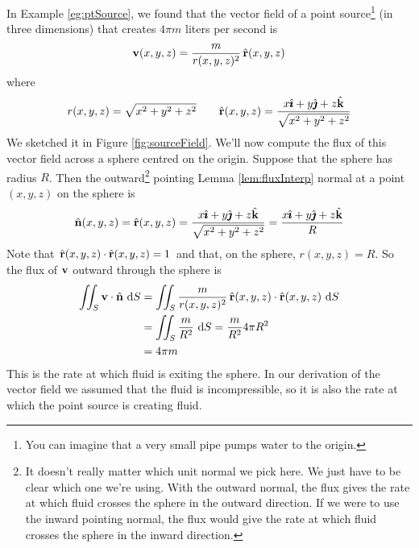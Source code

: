 \begin{eg}\label{eg:fluxIntegralA}
In Example \ref{eg:ptSource}, we found that the vector field of
a point source\footnote{You can imagine that a very small pipe pumps water to
the origin.} (in three dimensions) that creates $4\pi m$ liters per second 
is
\begin{equation*}
\mathbf{v}(x,y,z) = \frac{m}{r(x,y,z)^2}\,\hat{\mathbf{r}}(x,y,z)
\end{equation*}
where
\begin{equation*}
r(x,y,z) = \sqrt{x^2+y^2+z^2}\qquad
\hat{\mathbf{r}}(x,y,z) = \frac{x\hat{\pmb{\imath}} + y\hat{\pmb{\jmath}} + z\hat{\mathbf{k}}}{\sqrt{x^2+y^2+z^2}}
\end{equation*}
We sketched it in Figure \ref{fig:sourceField}.
We'll now compute the flux of this vector field across a
sphere centred on the origin. Suppose that the sphere has radius $R$.
Then the outward\footnote{It doesn't really matter which unit normal we pick here. We just have to be clear which one we're using. With the outward normal,
the flux gives the rate at which fluid crosses the sphere in the outward 
direction. If we were to use the inward pointing normal, the flux 
would give the rate at which fluid crosses the sphere in the inward 
direction.
} pointing Lemma \ref{lem:fluxInterp} normal at 
a point $(x,y,z)$ on the sphere is
\begin{equation*}
\hat{\mathbf{n}}(x,y,z) = \hat{\mathbf{r}}(x,y,z) = \frac{x\hat{\pmb{\imath}} + y\hat{\pmb{\jmath}} + z\hat{\mathbf{k}}}{\sqrt{x^2+y^2+z^2}}
= \frac{x\hat{\pmb{\imath}} + y\hat{\pmb{\jmath}} + z\hat{\mathbf{k}}}{R}
\end{equation*}
Note that $\hat{\mathbf{r}}(x,y,z)\cdot \hat{\mathbf{r}}(x,y,z)=1$ and that, on the sphere,
$r(x,y,z)=R$.
So the flux of $\mathbf{v}$ outward through the sphere is
\begin{align*}
 \iint_S\mathbf{v}\cdot\hat{\mathbf{n}}\ \mathrm{d}S
&= \iint_S \frac{m}{r(x,y,z)^2}\,\hat{\mathbf{r}}(x,y,z) \cdot \hat{\mathbf{r}}(x,y,z)\ \mathrm{d}S
\\
&= \iint_S \frac{m}{R^2}\ \mathrm{d}S
=\frac{m}{R^2} 4\pi R^2
\\
&=4\pi m
\end{align*}
This is the rate at which fluid is exiting the sphere.
In our derivation of the vector field we assumed that the fluid is
incompressible, so it is also the rate at which the point source is 
creating fluid.

\end{eg}


